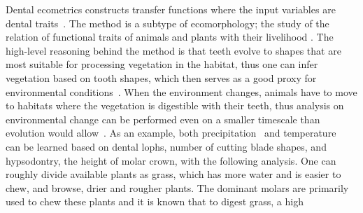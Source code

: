 \documentclass[english,twoside,openright]{UH_DS_MSc}
\begin{document}
Dental ecometrics constructs transfer functions where the input variables are dental traits~\cite{Faith_Lyman_2019, oksanenHumboldtianApproachLife2019}.
The method is a subtype of ecomorphology; the study of the relation of functional traits of animals and plants with their livelihood
\cite{oksanenHumboldtianApproachLife2019}. The high-level reasoning behind the method is that teeth evolve to 
shapes that are most suitable for processing vegetation in the habitat, thus one can infer vegetation based on tooth shapes, 
which then serves as a good proxy for environmental conditions~\cite{oksanenHumboldtianApproachLife2019}. 
When the environment changes, animals have to move to habitats where the vegetation is digestible with their teeth, thus 
analysis on environmental change can be performed even on a smaller timescale than evolution would allow~\cite{fortelius}. As an example, both precipitation~\cite{fortelius}
and temperature~\cite{oksanenHumboldtianApproachLife2019} can be learned based on dental lophs, number of cutting blade shapes, and hypsodontry, the height of 
molar crown, with the following analysis. One can roughly divide available plants as grass, which has more water and is easier to chew, and 
browse, drier and rougher plants. The dominant molars are primarily used to chew these plants and it is known that to digest grass, a high 
\end{document}
